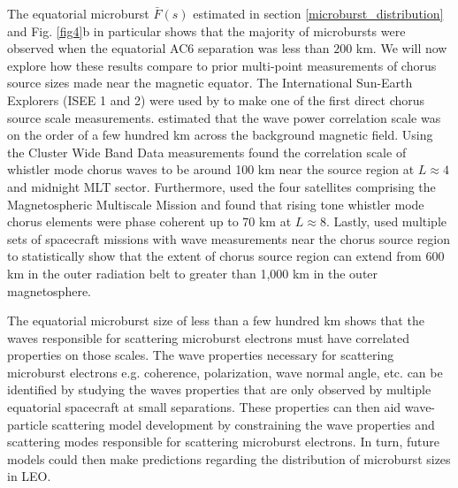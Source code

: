 The equatorial microburst $\bar{F}(s)$ estimated in section \ref{microburst_distribution} and Fig. \ref{fig4}b in particular shows that the majority of microbursts were observed when the equatorial AC6 separation was less than $200$ km. We will now explore how these results compare to prior multi-point measurements of chorus source sizes made near the magnetic equator. The International Sun-Earth Explorers (ISEE 1 and 2) were used by \citet{Gurnett1979} to make one of the first direct chorus source scale measurements. \citet{Gurnett1979} estimated that the wave power correlation scale was on the order of a few hundred km across the background magnetic field. Using the Cluster Wide Band Data measurements \citet{Santolik2003} found the correlation scale of whistler mode chorus waves to be around 100 km near the source region at $L \approx 4$ and midnight MLT sector. Furthermore, \citet{Turner2017} used the four satellites comprising the Magnetospheric Multiscale Mission and found that rising tone whistler mode chorus elements were phase coherent up to 70 km at $L \approx 8$. Lastly, \citet{Agapitov2010, Agapitov2011b, Agapitov2017a, Agapitov2018} used multiple sets of spacecraft missions with wave measurements near the chorus source region to statistically show that the extent of chorus source region can extend from 600 km in the outer radiation belt to greater than 1,000 km in the outer magnetosphere.

The equatorial microburst size of less than a few hundred km shows that the waves responsible for scattering microburst electrons must have correlated properties on those scales. The wave properties necessary for scattering microburst electrons e.g. coherence, polarization, wave normal angle, etc. can be identified by studying the waves properties that are only observed by multiple equatorial spacecraft at small separations. These properties can then aid wave-particle scattering model development by constraining the wave properties and scattering modes responsible for scattering microburst electrons. In turn, future models could then make predictions regarding the distribution of microburst sizes in LEO. 

